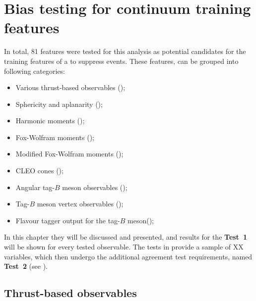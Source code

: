 \chapter{Bias testing for continuum \texorpdfstring{\BDT}{BDT} training features}\label{sec:appendix_continuum_features}

In total, 81 features were tested for this analysis as potential candidates for the training features of a \BDT to suppress \epem\ra\qqbar events.
These features, can be grouped into following categories:

\begin{itemize}
    \item Various thrust-based observables ();
    \item Sphericity and aplanarity ();
    \item Harmonic moments ();
    \item Fox-Wolfram moments ();
    \item Modified Fox-Wolfram moments ();
    \item CLEO cones ();
    \item Angular tag-$B$ meson observables ();
    \item Tag-$B$ meson vertex observables ();
    \item Flavour tagger output for the tag-$B$ meson();
\end{itemize}

In this chapter they will be discussed and presented, and results for the \textbf{Test~1} will be shown for every tested observable.
The tests in 
provide a sample of XX variables, which then undergo the additional agreement test requirements, named \textbf{Test~2} (see ).

\section{Thrust-based observables}\label{sec:thrusts}

\newpage

